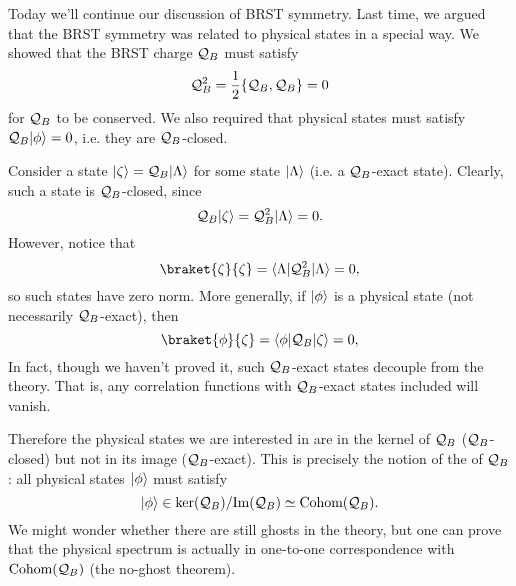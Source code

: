Today we'll continue our discussion of BRST symmetry. Last time, we argued that the BRST symmetry was related to physical states in a special way. We showed that the BRST charge $\mathcal Q_B$ must satisfy
\begin{equation}
    \mathcal Q_B^2 = \frac{1}{2}\{\mathcal Q_B,\mathcal Q_B\}=0
\end{equation}
for $\mathcal Q_B$ to be conserved. We also required that physical states must satisfy $\mathcal Q_B\lvert\phi\rangle=0$, i.e. they are $\mathcal Q_B$-closed.

Consider a state $\lvert\zeta\rangle=\mathcal Q_B \lvert\Lambda\rangle$ for some state $\lvert\Lambda\rangle$ (i.e. a $\mathcal Q_B$-exact state). Clearly, such a state is $\mathcal Q_B$-closed, since
\begin{equation}
    \mathcal Q_B\lvert\zeta\rangle=\mathcal Q_B^2 \lvert\Lambda\rangle=0.
\end{equation}
However, notice that
\begin{equation}
    \braket{\zeta}{\zeta}=\bra{\Lambda}\cQ_B^2\ket{\Lambda}=0,
\end{equation}
so such states have zero norm. More generally, if $\lvert\phi\rangle$ is a physical state (not necessarily $\mathcal Q_B$-exact), then
\begin{equation}
    \braket{\phi}{\zeta}=\bra{\phi}\cQ_B\ket{\zeta}=0,
\end{equation}
In fact, though we haven't proved it, such $\mathcal Q_B$-exact states decouple from the theory. That is, any correlation functions with $\mathcal Q_B$-exact states included will vanish.

Therefore the physical states we are interested in are in the kernel of $\mathcal Q_B$ ($\mathcal Q_B$-closed) but not in its image ($\mathcal Q_B$-exact). This is precisely the notion of the  of $\mathcal Q_B$: all physical states $\lvert\phi\rangle$ must satisfy
\begin{equation}
    \lvert\phi\rangle \in \text{ker}(\mathcal Q_B)/\text{Im}(\mathcal Q_B) \simeq \text{Cohom}(\mathcal Q_B).
\end{equation}
We might wonder whether there are still ghosts in the theory, but one can prove that the physical spectrum is actually in one-to-one correspondence with $\text{Cohom}(\mathcal Q_B)$ (the no-ghost theorem).


